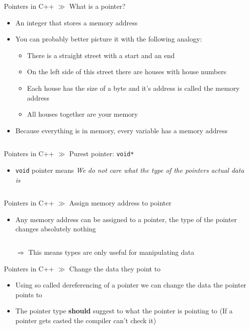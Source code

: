 \documentclass[10pt]{beamer}
\begin{document}
\begin{frame}{Pointers in C++ $\gg$ What is a pointer?}
\begin{itemize}
	\item An integer that stores a memory address
	\item You can probably better picture it with the following analogy:
	\begin{itemize}
		\item There is a straight street with a start and an end
		\item On the left side of this street there are houses with house numbers
		\item Each house has the size of a byte and it's address is called the memory address
		\item All houses together are your memory
	\end{itemize}
	\item Because everything is in memory, every variable has a memory address
	\inputminted[bgcolor=lightGreyCustom,fontsize=\scriptsize]{cpp}{./resources/memory_address.cpp}
\end{itemize}
\end{frame}

\begin{frame}{Pointers in C++ $\gg$ Purest pointer: \texttt{void*}}
\begin{itemize}
	\item \texttt{void} pointer means \textit{We do not care what the type of the pointers actual data is}
	\inputminted[bgcolor=lightGreyCustom,fontsize=\scriptsize]{cpp}{./resources/void_ptr.cpp}
\end{itemize}
\end{frame}

\begin{frame}{Pointers in C++ $\gg$ Assign memory address to pointer}
\begin{itemize}
	\item Any memory address can be assigned to a pointer, the type of the pointer changes absolutely nothing
	\inputminted[bgcolor=lightGreyCustom,fontsize=\scriptsize]{cpp}{./resources/assign_ptr.cpp}
	\item[$\Rightarrow$] This means types are only useful for manipulating data
\end{itemize}
\end{frame}

\begin{frame}{Pointers in C++ $\gg$ Change the data they point to}
\begin{itemize}
	\item Using so called dereferencing of a pointer we can change the data the pointer points to
	\item The pointer type \textbf{should} suggest to what the pointer is pointing to (If a pointer gets casted the compiler can't check it)
	\inputminted[bgcolor=lightGreyCustom,fontsize=\scriptsize]{cpp}{./resources/change_ptr_data.cpp}
\end{itemize}
\end{frame}
\end{document}
